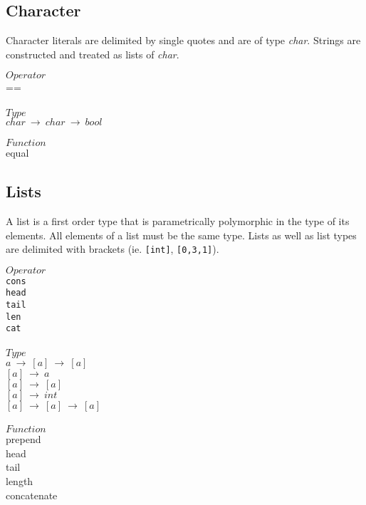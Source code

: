 \documentclass[5pt]{article}
\begin{document}
\subsection{Character}
Character literals are delimited by single quotes and are of type \textit{char}. 
Strings are constructed and treated as lists of \textit{char}.
\begin{multicols}{3}
\noindent $Operator$ \\
\hspace*{5mm} == \\
\columnbreak \\
\noindent $Type$ \\
$char \ \rightarrow \ char \ \rightarrow \ bool $ \\
\columnbreak \\
\noindent $Function$ \\
equal \\
\end{multicols}
\subsection{Lists}
A list is a first order type that is parametrically polymorphic in the type of 
its elements. All elements of a list must be the same type. Lists as well as 
list types are delimited with brackets (ie. \texttt{[int]}, \texttt{[0,3,1]}).
\begin{multicols}{3}
\noindent $Operator$ \\
\hspace*{5mm} \texttt{cons} \\
\hspace*{5mm} \texttt{head} \\
\hspace*{5mm} \texttt{tail} \\
\hspace*{5mm} \texttt{len} \\
\hspace*{5mm} \texttt{cat} \\
\columnbreak \\
\noindent $Type$ \\
$a \ \rightarrow \ [a] \ \rightarrow \ [a] $ \\
$[a] \ \rightarrow \ a $ \\
$[a] \ \rightarrow \ [a] $ \\
$[a] \ \rightarrow \ int $ \\
$[a] \ \rightarrow \ [a] \ \rightarrow \ [a] $ \\
\columnbreak \\
\noindent $Function$ \\
prepend \\
head \\
tail \\
length \\
concatenate \\
\end{multicols}
\end{document}
